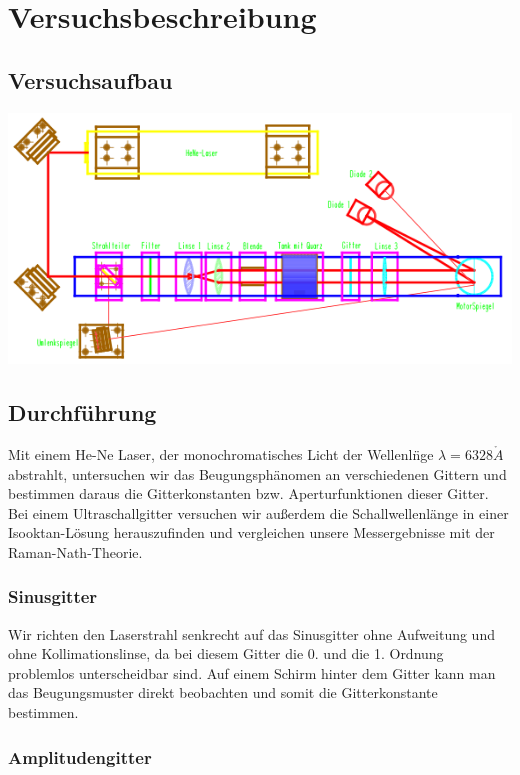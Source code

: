 \section{Versuchsbeschreibung}

\subsection{Versuchsaufbau}
\begin{center}
	\includegraphics[width = \textwidth]{Bilder/Aufbau.jpg}
\end{center}


\subsection{Durchf\"uhrung}

Mit einem He-Ne Laser, der monochromatisches Licht der Wellenl\"nge $\lambda = 6328 \mathring{A}$ abstrahlt, untersuchen wir das Beugungsph\"anomen an verschiedenen Gittern und bestimmen daraus die Gitterkonstanten bzw. Aperturfunktionen dieser Gitter. Bei einem Ultraschallgitter versuchen wir au\ss erdem die Schallwellenl\"ange in einer Isooktan-L\"osung herauszufinden und vergleichen unsere Messergebnisse mit der Raman-Nath-Theorie.

\subsubsection{Sinusgitter}

Wir richten den Laserstrahl senkrecht auf das Sinusgitter ohne Aufweitung und ohne Kollimationslinse, da bei diesem Gitter die 0. und die 1. Ordnung problemlos unterscheidbar sind. Auf einem Schirm hinter dem Gitter kann man das Beugungsmuster direkt beobachten und somit die Gitterkonstante bestimmen.

\subsubsection{Amplitudengitter}
